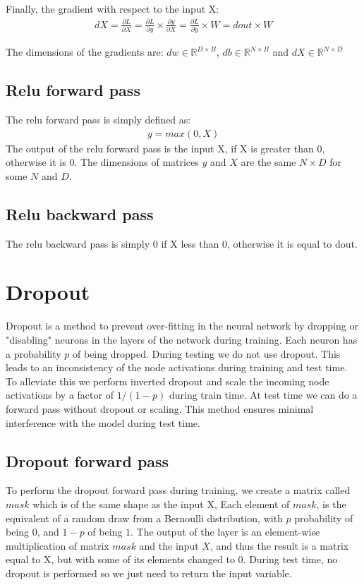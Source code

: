 \documentclass[12pt,twoside]{article}
\begin{document}
Finally, the gradient with respect to the input X:
\begin{align}
dX = \frac{\partial L}{\partial X} = \frac{\partial L}{\partial y} \times \frac{\partial y}{\partial X} = \frac{\partial L}{\partial y} \times W = dout \times W
\end{align}

The dimensions of the gradients are: $dw \in \mathbb{R}^{D \times B}$, $db \in \mathbb{R}^{N \times B}$ and $dX \in \mathbb{R}^{N \times D}$

\subsection{Relu forward pass}

The relu forward pass is simply defined as:
\begin{align}
y = max(0,X)
\end{align}
The output of the relu forward pass is the input X, if X is greater than 0, otherwise it is 0. The dimensions of matrices $y$ and $X$ are the same $N \times D$ for some $N$ and $D$.

\subsection{Relu backward pass}

The relu backward pass is simply 0 if X less than 0, otherwise it is equal to dout.

\section{Dropout}
Dropout is a method to prevent over-fitting in the neural network by dropping or "disabling" neurons in the layers of the network during training. Each neuron has a probability $p$ of being dropped. During testing we do not use dropout. This leads to an inconsistency of the node activations during training and test time. To alleviate this we perform inverted dropout and scale the incoming node activations by a factor of $1/(1-p)$ during train time. At test time we can do a forward pass without dropout or scaling. This method ensures minimal interference with the model during test time. 

\subsection{Dropout forward pass}
To perform the dropout forward pass during training, we create a matrix called $mask$ which is of the same shape as the input X, Each element of $mask$, is the equivalent of a random draw from a Bernoulli distribution, with $p$ probability of being $0$, and $1-p$ of being $1$. The output of the layer is an element-wise multiplication of matrix $mask$ and the input $X$, and thus the result is a matrix equal to X, but with some of its elements changed to 0. During test time, no dropout is performed so we just need to return the input variable.
\end{document}
